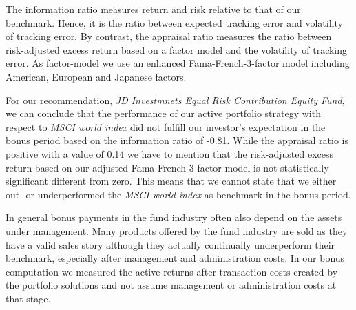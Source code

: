 \documentclass[11pt, parskip=full, DIV=14, headings=small, footsepline, footinclude=false, headsepline]{scrreprt}
\begin{document}
The information ratio measures return and risk relative to that of our benchmark. Hence, it is the ratio between expected tracking error and volatility of tracking error. By contrast, the appraisal ratio measures the ratio between risk-adjusted excess return based on a factor model and the volatility of tracking error. As factor-model we use an enhanced Fama-French-3-factor model including American, European and Japanese factors. 

For our recommendation, \textit{JD Investmnets Equal Risk Contribution Equity Fund}, we can conclude that the performance of our active portfolio strategy with respect to \textit{MSCI world index} did not fulfill our investor’s expectation in the bonus period based on the information ratio of -0.81. While the appraisal ratio is positive with a value of 0.14 we have to mention that the risk-adjusted excess return based on our adjusted Fama-French-3-factor model is not statistically significant different from zero. This means that we cannot state that we either out- or underperformed the \textit{MSCI world index} as benchmark in the bonus period. 

In general bonus payments in the fund industry often also depend on the assets under management. Many products offered by the fund industry are sold as they have a valid sales story although they actually continually underperform their benchmark, especially after management and administration costs. In our bonus computation we measured the active returns after transaction costs created by the portfolio solutions and not assume management or administration costs at that stage. 
\end{document}
